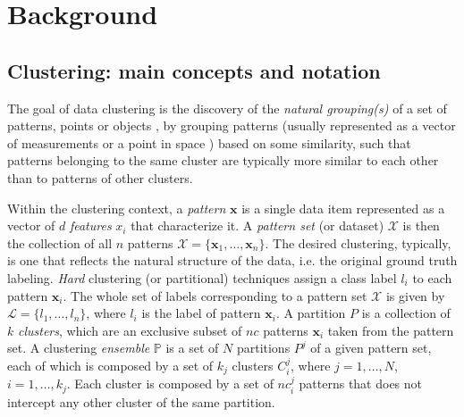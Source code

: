 
\section{Background}
\label{sec:backg}

\subsection{Clustering: main concepts and notation}

The goal of data clustering is the discovery of the \textit{natural grouping(s)} of a set of patterns, points or objects \cite{Jain2010}, by grouping patterns (usually represented as a vector of measurements or a point in space \cite{Jain1999}) based on some similarity, such that patterns belonging to the same cluster are typically more similar to each other than to patterns of other clusters.

Within the clustering context, a \emph{pattern} $\mathbf{x}$ is a single data item represented as a vector of $d$ \emph{features} $x_i$ that characterize it.
A \emph{pattern set} (or dataset) $\mathcal{X}$ is then the collection of all $n$ patterns $\mathcal{X} = \{ \mathbf{x}_1, \ldots, \mathbf{x}_n \}$.
The desired clustering, typically, is one that reflects the natural structure of the data, i.e. the original ground truth labeling.
\emph{Hard} clustering (or partitional) techniques assign a class label $l_i$ to each pattern $\mathbf{x}_i$.
The whole set of labels corresponding to a pattern set $\mathcal{X}$ is given by $\mathcal{L} = \{ l_1, \ldots, l_n \}$, where $l_i$ is the label of pattern $\mathbf{x}_i$.
A partition $P$ is a collection of $k$ \emph{clusters}, which are an exclusive subset of $nc$ patterns $\mathbf{x}_i$ taken from the pattern set.
A clustering \emph{ensemble} $\mathbb{P}$ is a set of $N$ partitions $P^j$ of a given pattern set, each of which is composed by a set of $k_j$ clusters $C^j_i$, where $j=1, \ldots, N$, $i=1, \ldots, k_j$.
Each cluster is composed by a set of $nc^j_i$ patterns that does not intercept any other cluster of the same partition.


